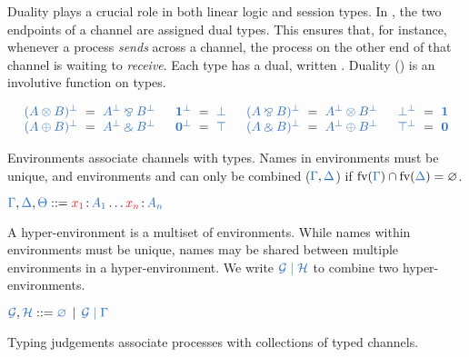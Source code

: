 \documentclass[UKenglish]{llncs}
\begin{document}
Duality plays a crucial role in both linear logic and session types.
In \cp, the two endpoints of a channel are assigned dual types.
This ensures that, for instance, whenever a process \emph{sends} across a
channel, the process on the other end of that channel is waiting to
\emph{receive}.
Each type  has a dual, written .
Duality (\ty{\cdot^\bot}) is an involutive function on types.
\begin{definition}[Duality]\label{def:cp-negation}
  \[
    \setlength{\arraycolsep}{3pt}
    \begin{array}{lclclcllclclcl}
              \ty{(A \tens B)^\bot} &=& \ty{A^\bot \parr B^\bot}
      &\quad \ty{\one^\bot}        &=& \ty{\bot}
      &\quad \ty{(A \parr B)^\bot} &=& \ty{A^\bot \tens B^\bot}
      &\quad \ty{\bot^\bot}        &=& \ty{\one}
      \\      \ty{(A \plus B)^\bot} &=& \ty{A^\bot \with B^\bot}
      &\quad \ty{\nil^\bot}        &=& \ty{\top}
      &\quad \ty{(A \with B)^\bot} &=& \ty{A^\bot \plus B^\bot}
      &\quad \ty{\top^\bot}        &=& \ty{\nil}
    \end{array}
  \]
\end{definition}
Environments associate channels with types. Names in environments must be unique, and environments \ty{\Gamma} and \ty{\Delta} can only be combined ($\ty{\Gamma}, \ty{\Delta}$) if $\text{fv}(\ty{\Gamma}) \cap \text{fv}(\ty{\Delta}) = \varnothing$. 
\begin{definition}[Environments]\label{def:cp-environments}
  $\ty{\Gamma}, \ty{\Delta}, \ty{\Theta} ::= \tmty{x_1}{A_1}\dots\tmty{x_n}{A_n}$
\end{definition}
A hyper-environment is a multiset of environments. While names within environments must be unique, names may be shared between multiple environments in a hyper-environment. We write $\ty{\mathcal{G} \hsep \mathcal{H}}$ to combine two hyper-environments.
\begin{definition}\label{def:hcp-hyper-environment}
  $\ty{\mathcal{G}}, \ty{\mathcal{H}} ::= \ty{\emptyhypercontext} \, \mid \, \ty{\mathcal{G} \hsep \Gamma}$
\end{definition}
Typing judgements associate processes with collections of typed channels.
\end{document}
